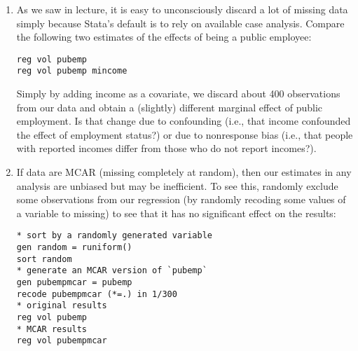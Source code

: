 \documentclass[a4paper,12pt]{article}
\begin{document}
\begin{enumerate}
	\begin{itemize}
	\item \texttt{.d}: don't know
	\item \texttt{.n}: no answer
	\item \texttt{.i}: not asked
	\end{itemize}

The multiple imputation algorithms in Stata only play well with traditional missing values (coded as \texttt{.}) so, for the sake of consistency, it is best to recode those early on before doing imputation of any kind.\footnote{Of course, it may be the case in a particular situation that you want to handle different kind of missingness in different ways, perhaps treating ``don't know'' responses as a specific value, but recoding ``no answer'', etc.} Here's some example code:
\begin{verbatim}
recode rincom98 (.d=.) (.n=.) (.i=.), gen(mincome)
recode educ (.d=.) (.n=.) (.i=.), gen(meduc)
recode madeg (.d=.) (.n=.) (.i=.), gen(mmoredu)
recode padeg (.d=.) (.n=.) (.i=.), gen(mfaredu)
recode age (.d=.) (.n=.) (.i=.), gen(mage)
\end{verbatim}


\item As we saw in lecture, it is easy to unconsciously discard a lot of missing data simply because Stata's default is to rely on available case analysis. Compare the following two estimates of the effects of being a public employee:

\begin{verbatim}
reg vol pubemp
reg vol pubemp mincome
\end{verbatim}

Simply by adding income as a covariate, we discard about 400 observations from our data and obtain a (slightly) different marginal effect of public employment. Is that change due to confounding (i.e., that income confounded the effect of employment status?) or due to nonresponse bias (i.e., that people with reported incomes differ from those who do not report incomes?).

\item If data are MCAR (missing completely at random), then our estimates in any analysis are unbiased but may be inefficient. To see this, randomly exclude some observations from our regression (by randomly recoding some values of a variable to missing) to see that it has no significant effect on the results:

\begin{verbatim}
* sort by a randomly generated variable
gen random = runiform()
sort random
* generate an MCAR version of `pubemp`
gen pubempmcar = pubemp
recode pubempmcar (*=.) in 1/300
* original results
reg vol pubemp
* MCAR results
reg vol pubempmcar
\end{verbatim}


\end{enumerate}
\end{document}
